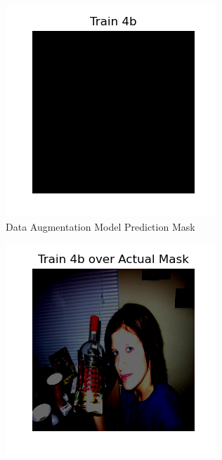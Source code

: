 \documentclass{article}
\begin{document}
\begin{figure}[h!]
  \centering
  \begin{subfigure}[b]{0.45\textwidth}
      \centering
      \includegraphics[width=\textwidth]{include/plots/train_4_b_pred.png}
      \caption{Data Augmentation Model Prediction Mask}
      \label{fig:data_augmentation_msk}
  \end{subfigure}
  \hfill %
  \begin{subfigure}[b]{0.45\textwidth}
      \centering
      \includegraphics[width=\textwidth]{include/plots/train_4_b_over_actual.png} %

\end{subfigure}
\end{figure}
\end{document}
